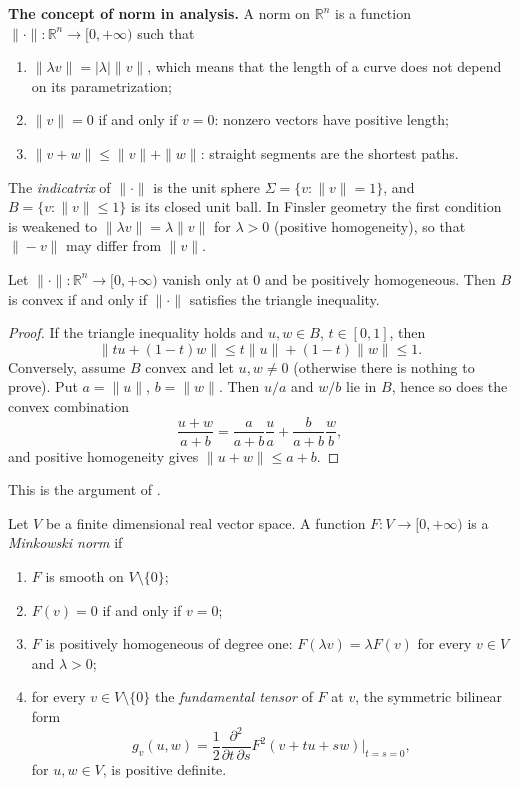 \medskip\noindent
{\bf The concept of norm in analysis.}
A norm on $\mathbb{R}^n$ is a function
$\|\cdot\| : \mathbb{R}^n \to [0,+\infty)$
such that
\begin{enumerate}
\item $\|\lambda v\| = |\lambda| \|v\|$,
which means that the length of a curve does
not depend on its parametrization;
\item $\|v\| = 0$ if and only if $v = 0$:
nonzero vectors have positive length;
\item $\|v + w\| \leq \|v\| + \|w\|$:
straight segments are the shortest paths.
\end{enumerate}
The \emph{indicatrix} of $\|\cdot\|$ is the
unit sphere
$\Sigma = \{v : \|v\| = 1\}$, and
$B = \{v : \|v\| \leq 1\}$ is its closed
unit ball. In Finsler geometry the first
condition is weakened to
$\|\lambda v\| = \lambda \|v\|$ for
$\lambda > 0$ (positive homogeneity), so
that $\|-v\|$ may differ from $\|v\|$.

\begin{proposition}
\label{proposition-javaloyes-convex-ball}
Let $\|\cdot\| : \mathbb{R}^n \to
[0,+\infty)$ vanish only at $0$ and be
positively homogeneous. Then $B$ is convex
if and only if $\|\cdot\|$ satisfies the
triangle inequality.
\end{proposition}

\begin{proof}
If the triangle inequality holds and
$u, w \in B$, $t \in [0,1]$, then
$$
\|tu + (1-t)w\| \leq t\|u\| + (1-t)\|w\|
\leq 1.
$$
Conversely, assume $B$ convex and let
$u, w \neq 0$ (otherwise there is nothing
to prove). Put $a = \|u\|$, $b = \|w\|$.
Then $u/a$ and $w/b$ lie in $B$, hence so
does the convex combination
$$
\frac{u + w}{a + b} =
\frac{a}{a+b}\frac{u}{a}
+ \frac{b}{a+b}\frac{w}{b},
$$
and positive homogeneity gives
$\|u + w\| \leq a + b$.
\end{proof}

\noindent
This is the argument of
\cite[Proposition 2.3]%
{javaloyes2014definition}.

\begin{definition}
\label{definition-javaloyes-minkowski-norm}
Let $V$ be a finite dimensional real vector
space. A function
$F : V \to [0,+\infty)$ is a
\emph{Minkowski norm} if
\begin{enumerate}
\item $F$ is smooth on $V \setminus \{0\}$;
\item $F(v) = 0$ if and only if $v = 0$;
\item $F$ is positively homogeneous of
degree one: $F(\lambda v) = \lambda F(v)$
for every $v \in V$ and $\lambda > 0$;
\item for every $v \in V \setminus \{0\}$
the \emph{fundamental tensor} of $F$ at $v$,
the symmetric bilinear form
$$
g_v(u,w) = \frac{1}{2}
\frac{\partial^2}{\partial t \, \partial s}
F^2(v + tu + sw) \Big|_{t=s=0},
$$
for $u, w \in V$, is positive definite.
\end{enumerate}
\end{definition}

